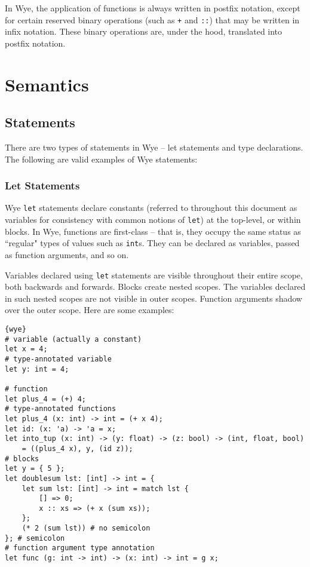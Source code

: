 \documentclass[a4paper, 12pt]{article}
\begin{document}
In Wye, the application of functions is always written in postfix notation, except for certain reserved binary operations (such as \texttt{+} and \texttt{::}) that may be written in infix notation. These binary operations are, under the hood, translated into postfix notation.

\section{Semantics}

\subsection{Statements}
There are two types of statements in Wye -- let statements and type declarations. The following are valid examples of Wye statements:

\subsubsection{Let Statements}
Wye \texttt{let} statements declare constants (referred to throughout this document as variables for consistency with common notions of \texttt{let}) at the top-level, or within blocks. In Wye, functions are first-class -- that is, they occupy the same status as ``regular" types of values such as \texttt{int}s. They can be declared as variables, passed as function arguments, and so on.

Variables declared using \texttt{let} statements are visible throughout their entire scope, both backwards and forwards. Blocks create nested scopes. The variables declared in such nested scopes are not visible in outer scopes. Function arguments shadow over the outer scope. Here are some examples:
\begin{lstlisting}{wye}
# variable (actually a constant)
let x = 4;
# type-annotated variable
let y: int = 4;

# function
let plus_4 = (+) 4;
# type-annotated functions
let plus_4 (x: int) -> int = (+ x 4);
let id: (x: 'a) -> 'a = x;
let into_tup (x: int) -> (y: float) -> (z: bool) -> (int, float, bool)
	= ((plus_4 x), y, (id z));
# blocks
let y = { 5 };
let doublesum lst: [int] -> int = {
	let sum lst: [int] -> int = match lst {
		[] => 0;
		x :: xs => (+ x (sum xs));
	};
	(* 2 (sum lst)) # no semicolon
}; # semicolon
# function argument type annotation
let func (g: int -> int) -> (x: int) -> int = g x;
\end{lstlisting}
\end{document}
